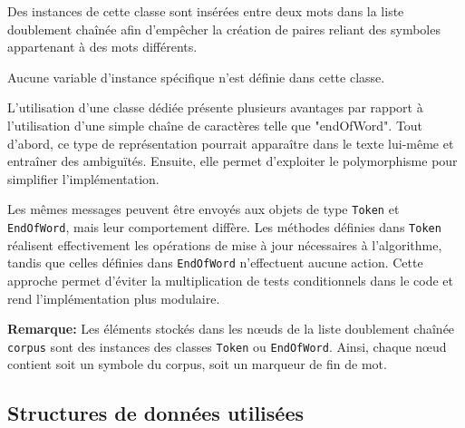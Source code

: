 \documentclass[12pt,a4paper]{report}
\begin{document}
	Des instances de cette classe sont insérées entre deux mots dans la liste doublement chaînée afin d’empêcher la création de paires reliant des symboles appartenant à des mots différents.
	
	Aucune variable d’instance spécifique n’est définie dans cette classe.
	
	L’utilisation d’une classe dédiée présente plusieurs avantages par rapport à l’utilisation d’une simple chaîne de caractères telle que "endOfWord". Tout d’abord, ce type de représentation pourrait apparaître dans le texte lui-même et entraîner des ambiguïtés. Ensuite, elle permet d’exploiter le polymorphisme pour simplifier l’implémentation.
	
	Les mêmes messages peuvent être envoyés aux objets de type \texttt{Token} et \texttt{EndOfWord}, mais leur comportement diffère. Les méthodes définies dans \texttt{Token} réalisent effectivement les opérations de mise à jour nécessaires à l’algorithme, tandis que celles définies dans \texttt{EndOfWord} n’effectuent aucune action. Cette approche permet d’éviter la multiplication de tests conditionnels dans le code et rend l’implémentation plus modulaire.
	
	\textbf{Remarque:} Les éléments stockés dans les nœuds de la liste doublement chaînée \texttt{corpus} sont des instances des classes \texttt{Token} ou \texttt{EndOfWord}. Ainsi, chaque nœud contient soit un symbole du corpus, soit un marqueur de fin de mot.
	
	\subsection{Structures de données utilisées}
	
\end{document}
